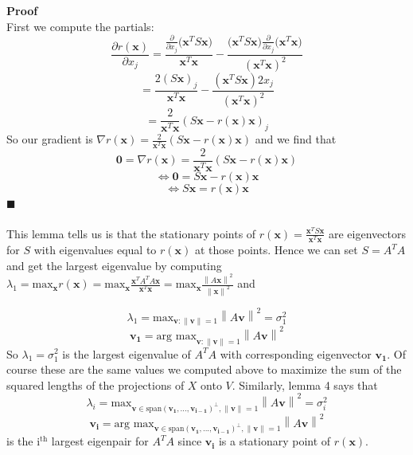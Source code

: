 \documentclass{tufte-handout}
\newcommand{\norm}[1]{\left\lVert#1\right\rVert}
\renewcommand{\qedsymbol}{$\blacksquare$}
\begin{document}
\noindent \textbf{Proof}\\
\noindent First we compute the partials:
\[
\frac{\partial r(\mathbf{x})}{\partial x_j}
=
\frac{\frac{\partial}{\partial x_j} \Big(\mathbf{x}^TS\mathbf{x}\Big)}{\mathbf{x}^T\mathbf{x}}
-
\frac{\Big(\mathbf{x}^TS\mathbf{x}\Big)\frac{\partial}{\partial x_j}\Big(\mathbf{x}^T\mathbf{x}\Big)}{(\mathbf{x}^T\mathbf{x})^2}
\]
\[
=
\frac{2(S\mathbf{x})_j}{\mathbf{x}^T\mathbf{x}}
-
\frac{(\mathbf{x}^TS\mathbf{x})2x_j}{(\mathbf{x}^T\mathbf{x})^2}
\]
\[
=
\frac{2}{\mathbf{x}^T\mathbf{x}}
(S\mathbf{x}-r(\mathbf{x})\mathbf{x})_j
\]
So our gradient is $\nabla r(\mathbf{x})=\frac{2}{\mathbf{x}^T\mathbf{x}}(S\mathbf{x}-r(\mathbf{x})\mathbf{x})$ and we find that
\[
\mathbf{0}=
\nabla r(\mathbf{x})=\frac{2}{\mathbf{x}^T\mathbf{x}}(S\mathbf{x}-r(\mathbf{x})\mathbf{x})
\]
\[
\iff
\mathbf{0}
=
S\mathbf{x}-r(\mathbf{x})\mathbf{x}
\]
\[
\iff
S\mathbf{x}=r(\mathbf{x})\mathbf{x}
\]
\qedsymbol\\\leavevmode\\

\noindent This lemma tells us is that the stationary points of $r(\mathbf{x})=\frac{\mathbf{x}^TS\mathbf{x}}{\mathbf{x}^T\mathbf{x}}$ are eigenvectors for $S$ with eigenvalues equal to $r(\mathbf{x})$ at those points. Hence we can set $S=A^TA$ and get the largest eigenvalue by computing $\lambda_1=\text{max}_\mathbf{x}r(\mathbf{x})=\text{max}_\mathbf{x}\frac{\mathbf{x}^TA^TA\mathbf{x}}{\mathbf{x}^T\mathbf{x}}=\text{max}_\mathbf{x}\frac{\norm{A\mathbf{x}}^2}{\norm{\mathbf{x}}^2}$ and

\[
\lambda_1=
\text{max}_{\mathbf{v}:\norm{\mathbf{v}}=1}\norm{A\mathbf{v}}^2=\sigma_{1}^2
\]
\[
\mathbf{v_1}=
\text{arg max}_{\mathbf{v}:\norm{\mathbf{v}}=1}\norm{A\mathbf{v}}^2
\]
So $\lambda_1=\sigma_{1}^2$ is the largest eigenvalue of $A^TA$ with corresponding eigenvector $\mathbf{v_1}$. Of course these are the same values we computed above to maximize the sum of the squared lengths of the projections of $X$ onto $V$. Similarly, lemma 4 says that
\[
\lambda_i=
\text{max}_{\mathbf{v}\in\text{span}(\mathbf{v_1},...,\mathbf{v_{i-1}})^\perp,\norm{\mathbf{v}}=1}\norm{A\mathbf{v}}^2=\sigma_{i}^2
\]
\[
\mathbf{v_i}=
\text{arg max}_{\mathbf{v}\in\text{span}(\mathbf{v_1},...,\mathbf{v_{i-1}})^\perp,\norm{\mathbf{v}}=1}\norm{A\mathbf{v}}^2
\]
\noindent is the i$^{\text{th}}$ largest eigenpair for $A^TA$ since $\mathbf{v_i}$ is a stationary point of $r(\mathbf{x})$.\\\leavevmode\\
\end{document}

